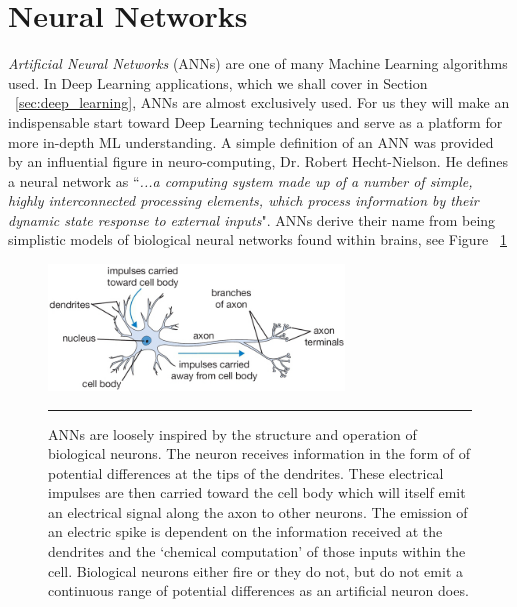 \section{Neural Networks}\label{sec:neural_networks}

\textit{Artificial Neural Networks} (ANNs) are one of many Machine Learning algorithms used.
In Deep Learning applications, which we shall cover in Section ~\ref{sec:deep_learning}, ANNs are almost exclusively used.
For us they will make an indispensable start toward Deep Learning techniques and serve as a platform for more in-depth ML understanding.
A simple definition of an ANN was provided by an influential figure in neuro-computing, Dr. Robert Hecht-Nielson.
He defines a neural network as ``\textit{...a computing system made up of a number of simple, highly interconnected processing elements, which process information by their dynamic state response to external inputs}"\citep{caudill1989neural}.
ANNs derive their name from being simplistic models of biological neural networks found within brains, see Figure ~\ref{fig:Biological_Neuron} 
\begin{figure}[htbp]
	\centering
		\includegraphics[width = 0.7\textwidth]{./Figures/neuron.png}
		\rule{35em}{0.5pt}
	\caption[Biological Neuron]{ANNs are loosely inspired by the structure and operation of biological neurons. The neuron receives information in the form of of potential differences at the tips of the dendrites. These electrical impulses are then carried toward the cell body which will itself emit an electrical signal along the axon to other neurons. The emission of an electric spike is dependent on the information received at the dendrites and the `chemical computation' of those inputs within the cell. Biological neurons either fire or they do not, but do not emit a continuous range of potential differences as an artificial neuron does.}
	\label{fig:Biological_Neuron}
\end{figure}

